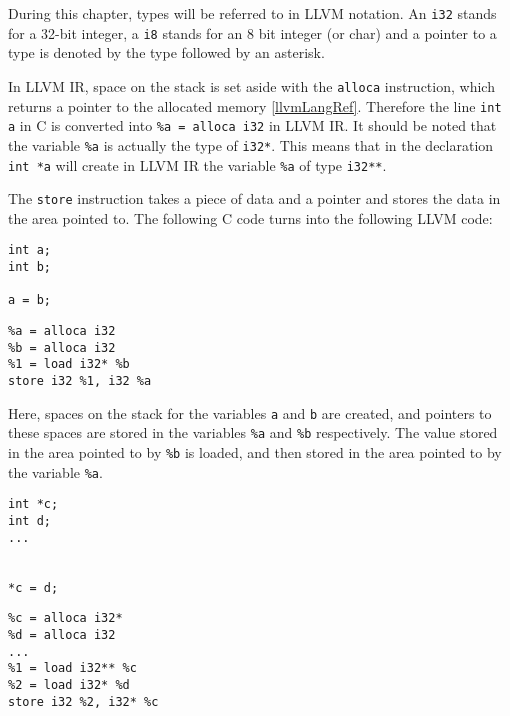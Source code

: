 During this chapter, types will be referred to in LLVM notation.
An \verb!i32! stands for a 32-bit integer, a \verb!i8! stands for an 8 bit integer (or char) and a pointer to a type is denoted by the type followed by an asterisk.

In LLVM IR, space on the stack is set aside with the \verb!alloca! instruction, which returns a pointer to the allocated memory \ref{llvmLangRef}.
Therefore the line \verb!int a! in C is converted into \verb!%a = alloca i32! in LLVM IR.
It should be noted that the variable \verb!%a! is actually the type of \verb!i32*!.
This means that in the declaration \verb!int *a! will create in LLVM IR the variable \verb!%a! of type \verb!i32**!.

The \verb!store! instruction takes a piece of data and a pointer and stores the data in the area pointed to.
The following C code turns into the following LLVM code:

\begin{minipage}[t]{0.5\linewidth}
\begin{verbatim}
int a;
int b;

a = b;
\end{verbatim}
\end{minipage}
\begin{minipage}[t]{0.5\linewidth}
\begin{verbatim}
%a = alloca i32
%b = alloca i32
%1 = load i32* %b
store i32 %1, i32 %a
\end{verbatim}
\end{minipage}

Here, spaces on the stack for the variables \verb!a! and \verb!b! are created, and pointers to these spaces are stored in the variables \verb!%a! and \verb!%b! respectively.
The value stored in the area pointed to by \verb!%b! is loaded, and then stored in the area pointed to by the variable \verb!%a!.

\begin{minipage}[t]{0.5\linewidth}
\begin{verbatim}
int *c;
int d;
...


*c = d;
\end{verbatim}
\end{minipage}
\begin{minipage}[t]{0.5\linewidth}
\begin{verbatim}
%c = alloca i32*
%d = alloca i32
...
%1 = load i32** %c
%2 = load i32* %d
store i32 %2, i32* %c
\end{verbatim}
\end{minipage}

